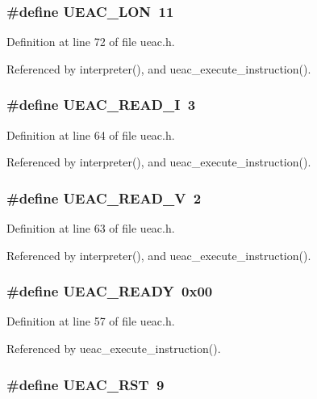 \subsubsection{\setlength{\rightskip}{0pt plus 5cm}\#define UEAC\_\-LON~11}\label{ueac_8h_a19}




Definition at line 72 of file ueac.h.

Referenced by interpreter(), and ueac\_\-execute\_\-instruction().
\subsubsection{\setlength{\rightskip}{0pt plus 5cm}\#define UEAC\_\-READ\_\-I~3}\label{ueac_8h_a11}




Definition at line 64 of file ueac.h.

Referenced by interpreter(), and ueac\_\-execute\_\-instruction().
\subsubsection{\setlength{\rightskip}{0pt plus 5cm}\#define UEAC\_\-READ\_\-V~2}\label{ueac_8h_a10}




Definition at line 63 of file ueac.h.

Referenced by interpreter(), and ueac\_\-execute\_\-instruction().
\subsubsection{\setlength{\rightskip}{0pt plus 5cm}\#define UEAC\_\-READY~0x00}\label{ueac_8h_a6}




Definition at line 57 of file ueac.h.

Referenced by ueac\_\-execute\_\-instruction().
\subsubsection{\setlength{\rightskip}{0pt plus 5cm}\#define UEAC\_\-RST~9}\label{ueac_8h_a17}





